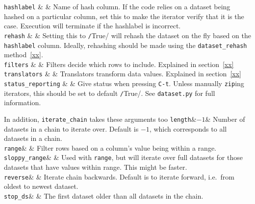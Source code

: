   \RP \texttt{hashlabel} & \pyNone & Name of hash column.  If the code relies
  on a dataset being hashed on a particular column, set this to make
  the iterator verify that it is the case.  Execution will terminate
  if the hashlabel is incorrect.\\

  \RP \texttt{rehash} & \pyFalse & Setting this to \texttt/True/
  will rehash the dataset on the fly based on the \texttt{hashlabel}
  column.  Ideally, rehashing should be made using the
  \texttt{dataset\_rehash} method~\ref{xx}.\\
  
  \RP \texttt{filters} & \pyNone & Filters decide which rows to include.
  Explained in section~\ref{xx}\\

  \RP \texttt{translators} & \pyNone & Translators transform data values.
  Explained in section~\ref{xx}\\
  
  \RP \texttt{status\_reporting} & \pyTrue & Give status when pressing
  \texttt{C-t}.  Unless manually \texttt{zip}ing iterators, this
  should be set to default \texttt/True/.  See
  \texttt{dataset.py} for full information.\\
\stoptable

In addition, \texttt{iterate\_chain} takes these arguments too
\starttable
  \RP \texttt{length}&$-1$& Number of datasets in a chain to iterate over.
  Default is $-1$, which corresponds to all datasets in a chain.\\
  
  \RP \texttt{range}& \pyNone& Filter rows based on a column's value being
  within a range.\\

  \RP \texttt{sloppy\_range}& \pyFalse & Used with \texttt{range}, but will
  iterate over full datasets for those datasets that have values
  within range.  This might be faster.\\
  
  \RP \texttt{reverse}& \pyFalse & Iterate chain
  backwards.  Default is to iterate forward, i.e.\ from oldest to
  newest dataset.\\

  \RP \texttt{stop\_ds}& \pyNone & The first dataset older than all datasets in the chain.\\ 

